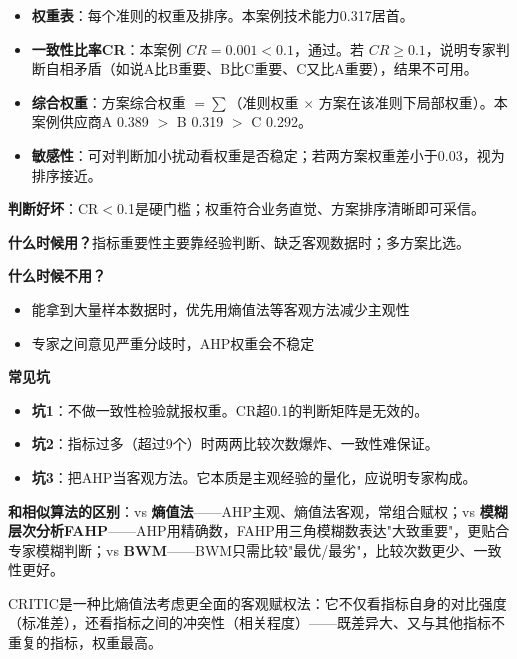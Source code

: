 \begin{algoresult}
\begin{itemize}
    \item \textbf{权重表}：每个准则的权重及排序。本案例技术能力0.317居首。
    \item \textbf{一致性比率CR}：本案例 $CR=0.001<0.1$，通过。若 $CR\geq0.1$，说明专家判断自相矛盾（如说A比B重要、B比C重要、C又比A重要），结果不可用。
    \item \textbf{综合权重}：方案综合权重 $=\sum$（准则权重 $\times$ 方案在该准则下局部权重）。本案例供应商A 0.389 $>$ B 0.319 $>$ C 0.292。
    \item \textbf{敏感性}：可对判断加小扰动看权重是否稳定；若两方案权重差小于0.03，视为排序接近。
\end{itemize}

\textbf{判断好坏}：CR$<$0.1是硬门槛；权重符合业务直觉、方案排序清晰即可采信。
\end{algoresult}

\begin{algonotes}
\textbf{什么时候用？}指标重要性主要靠经验判断、缺乏客观数据时；多方案比选。

\textbf{什么时候不用？}
\begin{itemize}
    \item 能拿到大量样本数据时，优先用熵值法等客观方法减少主观性
    \item 专家之间意见严重分歧时，AHP权重会不稳定
\end{itemize}

\textbf{常见坑}
\begin{itemize}
    \item \textbf{坑1}：不做一致性检验就报权重。CR超0.1的判断矩阵是无效的。
    \item \textbf{坑2}：指标过多（超过9个）时两两比较次数爆炸、一致性难保证。
    \item \textbf{坑3}：把AHP当客观方法。它本质是主观经验的量化，应说明专家构成。
\end{itemize}

\textbf{和相似算法的区别}：vs \textbf{熵值法}——AHP主观、熵值法客观，常组合赋权；vs \textbf{模糊层次分析FAHP}——AHP用精确数，FAHP用三角模糊数表达"大致重要"，更贴合专家模糊判断；vs \textbf{BWM}——BWM只需比较"最优/最劣"，比较次数更少、一致性更好。
\end{algonotes}


\begin{algointro}
CRITIC是一种比熵值法考虑更全面的客观赋权法：它不仅看指标自身的对比强度（标准差），还看指标之间的冲突性（相关程度）——既差异大、又与其他指标不重复的指标，权重最高。
\end{algointro}

